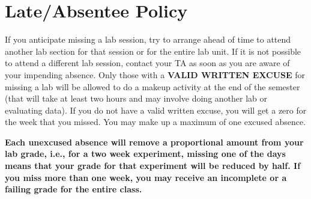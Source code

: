 \section*{Late/Absentee Policy}
If you anticipate missing a lab session, try to arrange ahead of time to attend another lab section for that session or for the entire lab unit.
If it is not possible to attend a different lab session, contact your TA as soon as you are aware of your impending absence.
Only those with a \textbf{VALID WRITTEN EXCUSE} for missing a lab will be allowed to do a makeup activity at the end of the semester (that will take at least two hours and may involve doing another lab or evaluating data).
If you do not have a valid written excuse, you will get a zero for the week that you missed.
You may make up a maximum of one excused absence.
\par
\textbf{Each unexcused absence will remove a proportional amount from your lab grade, i.e., for a two week experiment, missing one of the days means that your grade for that experiment will be reduced by half.
If you miss more than one week, you may receive an incomplete or a failing grade for the entire class.}

\newpage

